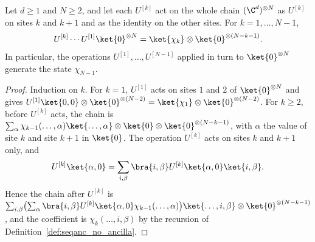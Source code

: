\begin{lemma}
    \label{thm:seqanc_no_ancilla_chain}
    \leanok
    Let $d\ge 1$ and $N\ge 2$, and let each $U^{[k]}$ act on the whole chain
    $(\C^d)^{\otimes N}$ as $U^{[k]}$ on sites $k$ and $k+1$ and as the
    identity on the other sites. For $k=1,\dots,N-1$,
    \begin{align*}
        U^{[k]}\cdots U^{[1]}\ket{0}^{\otimes N}
        =\ket{\chi_k}\otimes\ket{0}^{\otimes(N-k-1)}.
    \end{align*}
    In particular, the operations $U^{[1]},\dots,U^{[N-1]}$ applied in turn to
    $\ket{0}^{\otimes N}$ generate the state $\chi_{N-1}$.
\end{lemma}
\begin{proof}
    \leanok
    Induction on $k$. For $k=1$, $U^{[1]}$ acts on sites $1$ and $2$ of
    $\ket{0}^{\otimes N}$ and gives $U^{[1]}\ket{0,0}\otimes\ket{0}^{\otimes(N-2)}
        =\ket{\chi_1}\otimes\ket{0}^{\otimes(N-2)}$. For $k\ge 2$, before
    $U^{[k]}$ acts, the chain is
    $\sum_\alpha\chi_{k-1}(\dots,\alpha)\ket{\dots,\alpha}\otimes\ket{0}
        \otimes\ket{0}^{\otimes(N-k-1)}$, with $\alpha$ the value of site $k$ and
    site $k+1$ in $\ket{0}$. The operation $U^{[k]}$ acts on sites $k$ and
    $k+1$ only, and
    \begin{align*}
        U^{[k]}\ket{\alpha,0}
        =\sum_{i,\beta}\bra{i,\beta}U^{[k]}\ket{\alpha,0}\ket{i,\beta}.
    \end{align*}
    Hence the chain after $U^{[k]}$ is
    $\sum_{i,\beta}\bigl(\sum_\alpha\bra{i,\beta}U^{[k]}\ket{\alpha,0}
        \chi_{k-1}(\dots,\alpha)\bigr)\ket{\dots,i,\beta}\otimes
        \ket{0}^{\otimes(N-k-1)}$, and the coefficient is $\chi_k(\dots,i,\beta)$
    by the recursion of Definition~\ref{def:seqanc_no_ancilla}.
\end{proof}

